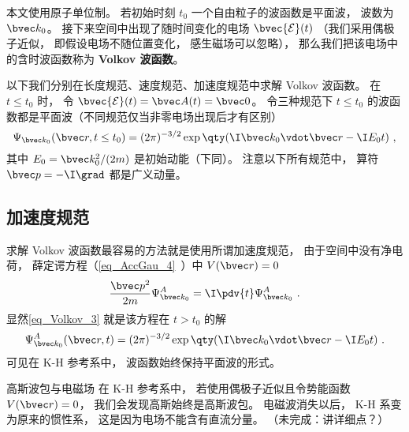 

本文使用原子单位制。 若初始时刻 $t_0$ 一个自由粒子的波函数是平面波， 波数为 $\bvec k_0$。 接下来空间中出现了随时间变化的电场 $\bvec {\mathcal E}(t)$ （我们采用偶极子近似， 即假设电场不随位置变化， 感生磁场可以忽略）， 那么我们把该电场中的含时波函数称为 \textbf{Volkov 波函数}。

以下我们分别在长度规范、速度规范、加速度规范中求解 Volkov 波函数。 在 $t \le t_0$ 时， 令 $\bvec {\mathcal E}(t) = \bvec A(t) = \bvec 0$。 令三种规范下 $t \le t_0$ 的波函数都是平面波（不同规范仅当非零电场出现后才有区别）
\begin{equation}\label{eq_Volkov_3}
\Psi_{\bvec k_0}(\bvec r, t \le t_0) = (2\pi)^{-3/2} \exp\qty(\I\bvec k_0 \vdot \bvec r - \I E_0 t)~,
\end{equation}
其中 $E_0 = \bvec k_0^2/(2m)$ 是初始动能（下同）。 注意以下所有规范中， 算符 $\bvec p = -\I \grad$ 都是广义动量。

\subsection{加速度规范}
求解 Volkov 波函数最容易的方法就是使用所谓加速度规范， 由于空间中没有净电荷， 薛定谔方程（\autoref{eq_AccGau_4}~）中 $V(\bvec r) = 0$
\begin{equation}
\frac{\bvec p^2}{2m}\Psi_{\bvec k_0}^A = \I \pdv{t} \Psi_{\bvec k_0}^A~.
\end{equation}
显然\autoref{eq_Volkov_3} 就是该方程在 $t > t_0$ 的解
\begin{equation}\label{eq_Volkov_2}
\Psi_{\bvec k_0}^A(\bvec r, t) = (2\pi)^{-3/2} \exp\qty(\I\bvec k_0 \vdot \bvec r - \I E_0 t)~.
\end{equation}
可见在 K-H 参考系中， 波函数始终保持平面波的形式。

\begin{example}{高斯波包与电磁场}
在 K-H 参考系中， 若使用偶极子近似且令势能函数 $V(\bvec r) = 0$， 我们会发现高斯始终是高斯波包。 电磁波消失以后， K-H 系变为原来的惯性系， 这是因为电场不能含有直流分量。 （未完成：讲详细点？）
\end{example}

